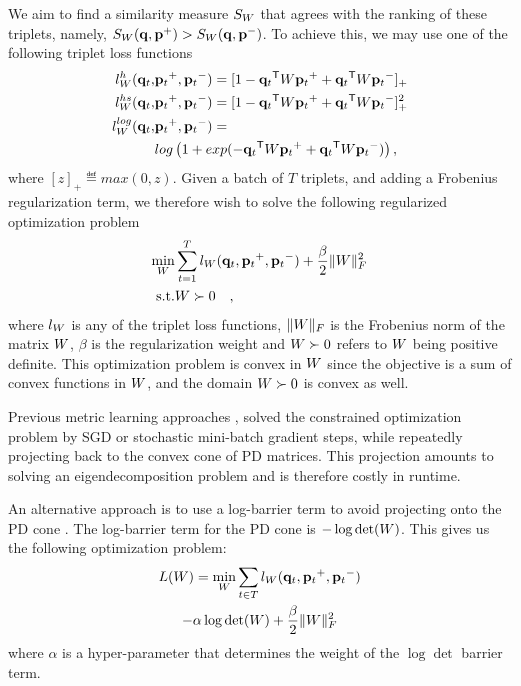 \documentclass{article}
\begin{document}
We aim to find a similarity measure $S_{{W}}$ that agrees with the ranking of these triplets, namely, $S_{{W}}({\mathbf{q}}, {\mathbf{p}}^{+}) > S_{{W}}({\mathbf{q}},
{\mathbf{p}}^{-})$. To achieve this, we may use one of the following triplet loss functions
\begin{align}
\label{single-triplet-lossed}
l_{{W}}^h({{\mathbf{q}}_{{t}}}, &{{\mathbf{p}}_{{t}}}^{+}, {{\mathbf{p}}_{{t}}}^{-}) = [1-{{\mathbf{q}}_{{t}}}{}^\mathsf{T}{W}{{\mathbf{p}}_{{t}}}^+ + {{\mathbf{q}}_{{t}}}{}^\mathsf{T}{W}{{\mathbf{p}}_{{t}}}^-]_{+}
 \\ \nonumber
l_{{W}}^{hs}({{\mathbf{q}}_{{t}}}, &{{\mathbf{p}}_{{t}}}^+, {{\mathbf{p}}_{{t}}}^-) = [1-{{\mathbf{q}}_{{t}}}{}^\mathsf{T}{W}{{\mathbf{p}}_{{t}}}^+ + {{\mathbf{q}}_{{t}}}{}^\mathsf{T}{W}{{\mathbf{p}}_{{t}}}^-]_{+}^2
 \\ \nonumber
l_{{W}}^{log}({{\mathbf{q}}_{{t}}}, &{{\mathbf{p}}_{{t}}}^+, {{\mathbf{p}}_{{t}}}^-) = \\ 
&log\left(1+exp(-{{\mathbf{q}}_{{t}}}{}^\mathsf{T}{W}{{\mathbf{p}}_{{t}}}^+ + {{\mathbf{q}}_{{t}}}{}^\mathsf{T}{W}{{\mathbf{p}}_{{t}}}^-)\right) \nonumber ,
\end{align}
where $[z]_{+} \eqdef max(0,z)$. Given a batch of $T$ triplets, and adding a Frobenius regularization term, we therefore wish to solve the following regularized optimization problem
\begin{eqnarray}
  \min_{{W}}& \sum_{{t}=1}^T  l_{{W}}({{\mathbf{q}}_{{t}}}, {{\mathbf{p}}_{{t}}}^+, {{\mathbf{p}}_{{t}}}^-) + \frac{\beta}{2} {\|{W}\|_F^2}
 \\  \nonumber
   \rm{s.t.}& {W} \succ 0 \quad,
  \label{hingelt}
\end{eqnarray}
where $l_{{W}}$ is any of the triplet loss functions, ${\|{W}\|_F}$ is the Frobenius norm of the matrix ${W}$, $\beta$ is the regularization weight and ${W} \succ 0$ refers to ${W}$ being positive definite. This optimization problem is convex in ${W}$ since the objective is a sum of convex functions in ${W}$, and the domain ${W} \succ 0$ is convex as well.

Previous metric learning approaches \cite{OASIS, qianHD, qian}, solved the constrained optimization problem by SGD or stochastic mini-batch gradient steps, while repeatedly projecting back to the convex cone of PD matrices. This projection amounts to solving an eigendecomposition problem and is therefore costly in runtime.

An alternative approach is to use a log-barrier term to avoid projecting onto the PD cone \cite{davis2007information,lego}. The log-barrier term for the PD cone is $- \log \det ({W})$. This gives us the following optimization problem:
\begin{multline}
\label{eq-logdet-loss}
  L(W) = 
  \min_{{W}} \sum_{{t} \in T}  l_{{W}}({{\mathbf{q}}_{{t}}}, {{\mathbf{p}}_{{t}}}^+, {{\mathbf{p}}_{{t}}}^-) \\ 
  - \alpha \log \det({W}) + \frac{\beta}{2} {\|{W}\|_F^2}
\end{multline}
where $\alpha$ is a hyper-parameter that determines the weight of the
$\log \det$ barrier term.
\end{document}
